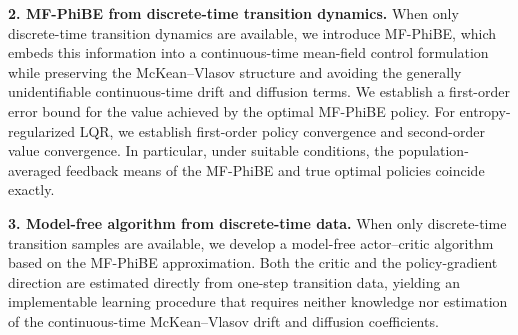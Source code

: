 \documentclass[a4paper, 10pt, english, reqno]{amsart}
\def\tcr{\textcolor{red}}
\begin{document}
\textbf{2. MF-PhiBE from discrete-time transition dynamics.}
When only discrete-time transition dynamics are available, we introduce MF-PhiBE, which embeds this information into a continuous-time mean-field control formulation while preserving the McKean--Vlasov structure and avoiding the generally unidentifiable continuous-time drift and diffusion terms. We establish a first-order error bound for the value achieved by the optimal MF-PhiBE policy. For entropy-regularized LQR, we establish first-order policy convergence and second-order value convergence.  In particular, under suitable conditions, the population-averaged feedback means of the MF-PhiBE and true optimal policies coincide exactly.
\smallbreak



\textbf{3. Model-free algorithm from discrete-time data.}
When only discrete-time transition samples are available, we develop a model-free actor--critic algorithm based on the MF-PhiBE approximation. Both the critic and the policy-gradient direction are estimated directly from one-step transition data, yielding an implementable learning procedure that requires neither knowledge nor estimation of the continuous-time McKean--Vlasov drift and diffusion coefficients.
\end{document}
